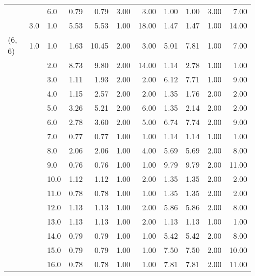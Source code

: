 \begin{tabular}{lllrrrrrrrr}
       &     & 6.0  &       0.79 &      0.79 &  3.00 &   3.00 &       1.00 &      1.00 & 3.00 &   7.00 \\
       & 3.0 & 1.0  &       5.53 &      5.53 &  1.00 &  18.00 &       1.47 &      1.47 & 1.00 &  14.00 \\
(6, 6) & 1.0 & 1.0  &       1.63 &     10.45 &  2.00 &   3.00 &       5.01 &      7.81 & 1.00 &   7.00 \\
       &     & 2.0  &       8.73 &      9.80 &  2.00 &  14.00 &       1.14 &      2.78 & 1.00 &   1.00 \\
       &     & 3.0  &       1.11 &      1.93 &  2.00 &   2.00 &       6.12 &      7.71 & 1.00 &   9.00 \\
       &     & 4.0  &       1.15 &      2.57 &  2.00 &   2.00 &       1.35 &      1.76 & 2.00 &   2.00 \\
       &     & 5.0  &       3.26 &      5.21 &  2.00 &   6.00 &       1.35 &      2.14 & 2.00 &   2.00 \\
       &     & 6.0  &       2.78 &      3.60 &  2.00 &   5.00 &       6.74 &      7.74 & 2.00 &   9.00 \\
       &     & 7.0  &       0.77 &      0.77 &  1.00 &   1.00 &       1.14 &      1.14 & 1.00 &   1.00 \\
       &     & 8.0  &       2.06 &      2.06 &  1.00 &   4.00 &       5.69 &      5.69 & 2.00 &   8.00 \\
       &     & 9.0  &       0.76 &      0.76 &  1.00 &   1.00 &       9.79 &      9.79 & 2.00 &  11.00 \\
       &     & 10.0 &       1.12 &      1.12 &  1.00 &   2.00 &       1.35 &      1.35 & 2.00 &   2.00 \\
       &     & 11.0 &       0.78 &      0.78 &  1.00 &   1.00 &       1.35 &      1.35 & 2.00 &   2.00 \\
       &     & 12.0 &       1.13 &      1.13 &  1.00 &   2.00 &       5.86 &      5.86 & 2.00 &   8.00 \\
       &     & 13.0 &       1.13 &      1.13 &  1.00 &   2.00 &       1.13 &      1.13 & 1.00 &   1.00 \\
       &     & 14.0 &       0.79 &      0.79 &  1.00 &   1.00 &       5.42 &      5.42 & 2.00 &   8.00 \\
       &     & 15.0 &       0.79 &      0.79 &  1.00 &   1.00 &       7.50 &      7.50 & 2.00 &  10.00 \\
       &     & 16.0 &       0.78 &      0.78 &  1.00 &   1.00 &       7.81 &      7.81 & 2.00 &  11.00 \\

\end{tabular}
